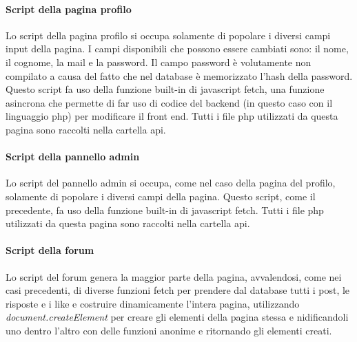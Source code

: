\paragraph{Script della pagina profilo}

Lo script della pagina profilo si occupa solamente di popolare i diversi campi input della pagina. I campi disponibili che possono essere cambiati sono: il nome, il cognome, la mail e la password. Il campo password è volutamente non compilato a causa 
del fatto che nel database è memorizzato l'hash della password. Questo script fa uso della funzione built-in di javascript fetch, una funzione asincrona che permette di far uso di codice del backend (in questo caso con il linguaggio php) per modificare il 
front end. Tutti i file php utilizzati da questa pagina sono raccolti nella cartella api.

\paragraph{Script della pannello admin}

Lo script del pannello admin si occupa, come nel caso della pagina del profilo, solamente di popolare i diversi campi della pagina. Questo script, come il precedente, fa uso della funzione built-in di javascript fetch. 
Tutti i file php utilizzati da questa pagina sono raccolti nella cartella api.

\paragraph{Script della forum}

Lo script del forum genera la maggior parte della pagina, avvalendosi, come nei casi precedenti, di diverse funzioni fetch per prendere dal database tutti i post, le risposte e i like e costruire dinamicamente l'intera pagina, utilizzando 
\textit{document.createElement} per creare gli elementi della pagina stessa e nidificandoli uno dentro l'altro con delle funzioni anonime e ritornando gli elementi creati. 




